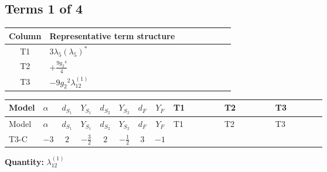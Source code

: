 \documentclass[8pt]{article}
\begin{document}
\begin{landscape}
\subsection*{Terms 1 of 4}
\begin{center}
\begin{tabular}{@{}c >{\raggedright\arraybackslash}p{0.82\linewidth}@{}}
\toprule
Column & Representative term structure \\
\midrule
T1 & \(\displaystyle 3 {\lambda_5} \left({\lambda_5}\right)^{*}\) \\
\midrule
T2 & \(\displaystyle +\frac{9 {g_2}^4}{4}\) \\
\midrule
T3 & \(\displaystyle -9 {g_2}^2 {\lambda_{12}^{(1)}}\) \\
\midrule
\bottomrule
\end{tabular}
\end{center}
\smallskip
\tiny
\begin{longtable}{@{}llcccccc >{\raggedright\arraybackslash}p{0.21\linewidth} >{\raggedright\arraybackslash}p{0.21\linewidth} >{\raggedright\arraybackslash}p{0.21\linewidth}@{}}
\toprule
Model & $\alpha$ & $d_{S_1}$ & $Y_{S_1}$ & $d_{S_2}$ & $Y_{S_2}$ & $d_F$ & $Y_F$ & T1 & T2 & T3 \\
\midrule
\endfirsthead
\toprule
Model & $\alpha$ & $d_{S_1}$ & $Y_{S_1}$ & $d_{S_2}$ & $Y_{S_2}$ & $d_F$ & $Y_F$ & T1 & T2 & T3 \\
\midrule
\endhead
T3-C & $-3$ & $2$ & $-\frac{3}{2}$ & $2$ & $-\frac{1}{2}$ & $3$ & $-1$ & \scriptsize\adjustbox{max width=\linewidth}{$\begin{gathered} 3 {\lambda_5} \left({\lambda_5}\right)^{*}\end{gathered}$} & \scriptsize\adjustbox{max width=\linewidth}{$\begin{gathered} +\frac{9 {g_2}^4}{4}\end{gathered}$} & \scriptsize\adjustbox{max width=\linewidth}{$\begin{gathered} -9 {g_2}^2 {\lambda_{12}^{(1)}}\end{gathered}$} \\
\midrule
\bottomrule
\end{longtable}
\clearpage
\noindent\textbf{Quantity: }$\lambda_{12}^{(1)}$\par\smallskip

\end{landscape}
\end{document}

